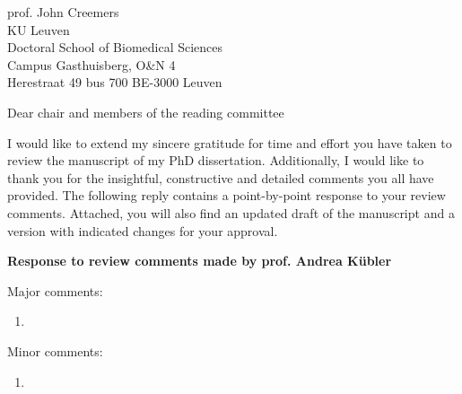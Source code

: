\documentclass{letter}
\newcommand{\reply}[1]{%
	\textbf{Response to review comments made by prof. #1}

}
\begin{document}
\signature{
	Arne Van Den Kerchove \\
	\texttt{arne.vandenkerchove@kuleuven.be} \\
	+32 473 32 78 71 \\
}
\address{
	KU Leuven \\
	Laboratory for Neuro- and Psychophysiology \\
	Campus Gasthuisberg, O\&N 2 \\
	Herestraat 49 bus 1021 \\
	BE-3000 Leuven
}

\begin{letter}{
	prof. John Creemers \\
	KU Leuven \\
	Doctoral School of Biomedical Sciences \\
	Campus Gasthuisberg, O\&N 4 \\
	Herestraat 49 bus 700
	BE-3000 Leuven

}
\opening{Dear chair and members of the reading committee}

I would like to extend my sincere gratitude for time and effort you have taken
to review the manuscript of my PhD dissertation.
Additionally, I would like to thank you for the insightful, constructive and
detailed comments you all have provided.
The following reply contains a point-by-point response to your review comments.
Attached, you will also find an updated draft of the manuscript and a version
with indicated changes for your approval.

\reply{Andrea K\"ubler}
Major comments:
\begin{enumerate}
	\item
\end{enumerate}
Minor comments:
\begin{enumerate}
	\item
\end{enumerate}


\end{letter}
\end{document}
